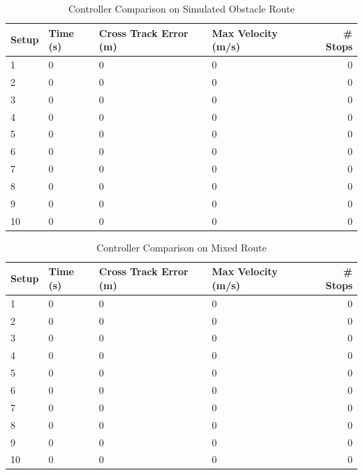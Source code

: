 \begin{table}[ht!]
\caption{Controller Comparison on Simulated Obstacle Route}
\small
\centering
\begin{tabular}{@{}llllr@{}} \toprule
Setup & Time (s) & Cross Track Error (m) & Max Velocity (m/s) & \# Stops \\ \midrule
1     & 0        & 0                     & 0                  & 0        \\
2     & 0        & 0                     & 0                  & 0        \\
3     & 0        & 0                     & 0                  & 0        \\
4     & 0        & 0                     & 0                  & 0        \\
5     & 0        & 0                     & 0                  & 0        \\
6     & 0        & 0                     & 0                  & 0        \\
7     & 0        & 0                     & 0                  & 0        \\
8     & 0        & 0                     & 0                  & 0        \\
9     & 0        & 0                     & 0                  & 0        \\
10    & 0        & 0                     & 0                  & 0        \\ \bottomrule
\end{tabular}
\label{tab:resultsControllersObstacles}
\end{table}

\begin{table}[ht!]
\caption{Controller Comparison on Mixed Route}
\small
\centering
\begin{tabular}{@{}llllr@{}} \toprule
Setup & Time (s) & Cross Track Error (m) & Max Velocity (m/s) & \# Stops \\ \midrule
1     & 0        & 0                     & 0                  & 0        \\
2     & 0        & 0                     & 0                  & 0        \\
3     & 0        & 0                     & 0                  & 0        \\
4     & 0        & 0                     & 0                  & 0        \\
5     & 0        & 0                     & 0                  & 0        \\
6     & 0        & 0                     & 0                  & 0        \\
7     & 0        & 0                     & 0                  & 0        \\
8     & 0        & 0                     & 0                  & 0        \\
9     & 0        & 0                     & 0                  & 0        \\
10    & 0        & 0                     & 0                  & 0        \\ \bottomrule
\end{tabular}
\label{tab:resultsControllersMixed}
\end{table}
